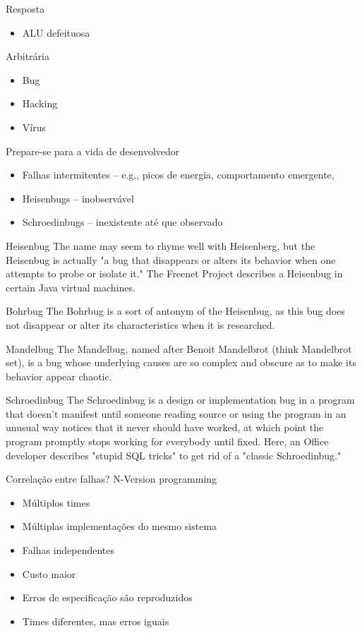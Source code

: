 \begin{frame}{Resposta}
\begin{itemize}
	\item ALU defeituosa
\end{itemize}
\end{frame}

\begin{frame}{Arbitrária}
\begin{itemize}
	\item Bug
	\item Hacking
	\item Vírus
\end{itemize}
\end{frame}


\begin{frame}{Prepare-se para a vida de desenvolvedor}
\begin{itemize}
	\item Falhas intermitentes -- e.g., picos de energia, comportamento emergente, 
	\item Heisenbugs -- inobservável
	\item Schroedinbugs	-- inexistente até que observado
\end{itemize}
\end{frame}

Heisenbug
The name may seem to rhyme well with Heisenberg, but the Heisenbug is actually "a bug that disappears or alters its behavior when one attempts to probe or isolate it." The Freenet Project describes a Heisenbug in certain Java virtual machines.

Bohrbug
The Bohrbug is a sort of antonym of the Heisenbug, as this bug does not disappear or alter its characteristics when it is researched.

Mandelbug
The Mandelbug, named after Benoit Mandelbrot (think Mandelbrot set), is a bug whose underlying causes are so complex and obscure as to make its behavior appear chaotic.

Schroedinbug
The Schroedinbug is a design or implementation bug in a program that doesn't manifest until someone reading source or using the program in an unusual way notices that it never should have worked, at which point the program promptly stops working for everybody until fixed. Here, an Office developer describes "stupid SQL tricks" to get rid of a "classic Schroedinbug." 



\begin{frame}{Correlação entre falhas?}
N-Version programming
\begin{itemize}
	\item Múltiplos times
	\item Múltiplas implementações do mesmo sistema
	\item Falhas independentes
	\vspace{1cm}
	\item Custo maior
	\item Erros de especificação são reproduzidos
	\item Times diferentes, mas erros iguais
\end{itemize}
\end{frame}



